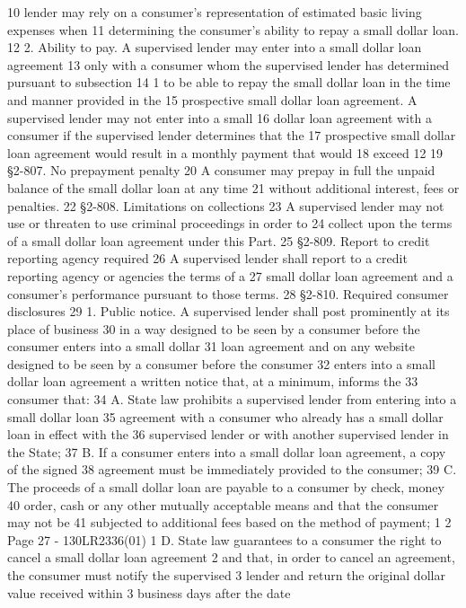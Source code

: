 10 lender may rely on a consumer's representation of estimated basic living expenses when
11 determining the consumer's ability to repay a small dollar loan.
12 2. Ability to pay. A supervised lender may enter into a small dollar loan agreement
13 only with a consumer whom the supervised lender has determined pursuant to subsection
14 1 to be able to repay the small dollar loan in the time and manner provided in the
15 prospective small dollar loan agreement. A supervised lender may not enter into a small
16 dollar loan agreement with a consumer if the supervised lender determines that the
17 prospective small dollar loan agreement would result in a monthly payment that would
18 exceed 12%
19 §2-807. No prepayment penalty
20 A consumer may prepay in full the unpaid balance of the small dollar loan at any time
21 without additional interest, fees or penalties.
22 §2-808. Limitations on collections
23 A supervised lender may not use or threaten to use criminal proceedings in order to
24 collect upon the terms of a small dollar loan agreement under this Part.
25 §2-809. Report to credit reporting agency required
26 A supervised lender shall report to a credit reporting agency or agencies the terms of a
27 small dollar loan agreement and a consumer's performance pursuant to those terms.
28 §2-810. Required consumer disclosures
29 1. Public notice. A supervised lender shall post prominently at its place of business
30 in a way designed to be seen by a consumer before the consumer enters into a small dollar
31 loan agreement and on any website designed to be seen by a consumer before the consumer
32 enters into a small dollar loan agreement a written notice that, at a minimum, informs the
33 consumer that:
34 A. State law prohibits a supervised lender from entering into a small dollar loan
35 agreement with a consumer who already has a small dollar loan in effect with the
36 supervised lender or with another supervised lender in the State;
37 B. If a consumer enters into a small dollar loan agreement, a copy of the signed
38 agreement must be immediately provided to the consumer;
39 C. The proceeds of a small dollar loan are payable to a consumer by check, money
40 order, cash or any other mutually acceptable means and that the consumer may not be
41 subjected to additional fees based on the method of payment;
1
2
Page 27 - 130LR2336(01)
1 D. State law guarantees to a consumer the right to cancel a small dollar loan agreement
2 and that, in order to cancel an agreement, the consumer must notify the supervised
3 lender and return the original dollar value received within 3 business days after the date
